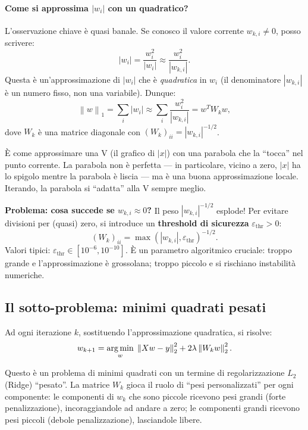 \documentclass[a4paper,11pt]{article}
\theoremstyle{definition}
\newcommand{\norm}[1]{\left\lVert #1 \right\rVert}
\newcommand{\argmin}{\operatornamewithlimits{arg\,min}}
\begin{document}
\paragraph{Come si approssima $|w_i|$ con un quadratico?}
L'osservazione chiave è quasi banale. Se conosco il valore corrente $w_{k,i} \neq 0$, posso scrivere:
\[
  |w_i| = \frac{w_i^2}{|w_i|} \approx \frac{w_i^2}{|w_{k,i}|}.
\]
Questa è un'approssimazione di $|w_i|$ che è \emph{quadratica} in $w_i$ (il denominatore $|w_{k,i}|$ è un numero fisso, non una variabile). Dunque:
\[
  \norm{w}_1 = \sum_i |w_i| \approx \sum_i \frac{w_i^2}{|w_{k,i}|} = w^T W_k w,
\]
dove $W_k$ è una matrice diagonale con $(W_k)_{ii} = |w_{k,i}|^{-1/2}$.

\begin{analogia}
È come approssimare una V (il grafico di $|x|$) con una parabola che la ``tocca'' nel punto corrente. La parabola non è perfetta --- in particolare, vicino a zero, $|x|$ ha lo spigolo mentre la parabola è liscia --- ma è una buona approssimazione locale. Iterando, la parabola si ``adatta'' alla V sempre meglio.
\end{analogia}

\begin{attenzione}
\textbf{Problema: cosa succede se $w_{k,i} \approx 0$?} Il peso $|w_{k,i}|^{-1/2}$ esplode! Per evitare divisioni per (quasi) zero, si introduce un \textbf{threshold di sicurezza} $\varepsilon_{\text{thr}} > 0$:
\[
  (W_k)_{ii} = \max(|w_{k,i}|, \varepsilon_{\text{thr}})^{-1/2}.
\]
Valori tipici: $\varepsilon_{\text{thr}} \in [10^{-6}, 10^{-10}]$. È un parametro algoritmico cruciale: troppo grande e l'approssimazione è grossolana; troppo piccolo e si rischiano instabilità numeriche.
\end{attenzione}

\subsection{Il sotto-problema: minimi quadrati pesati}
\label{subsec:irls_sub}

Ad ogni iterazione $k$, sostituendo l'approssimazione quadratica, si risolve:
\begin{equation}\label{eq:irls_sub}
  w_{k+1} = \argmin_w\; \norm{Xw - y}_2^2 + 2\lambda\norm{W_k w}_2^2.
\end{equation}

\begin{intuizione}
Questo è un problema di minimi quadrati con un termine di regolarizzazione $L_2$ (Ridge) ``pesato''. La matrice $W_k$ gioca il ruolo di ``pesi personalizzati'' per ogni componente: le componenti di $w_k$ che sono piccole ricevono pesi grandi (forte penalizzazione), incoraggiandole ad andare a zero; le componenti grandi ricevono pesi piccoli (debole penalizzazione), lasciandole libere.
\end{intuizione}
\end{document}
